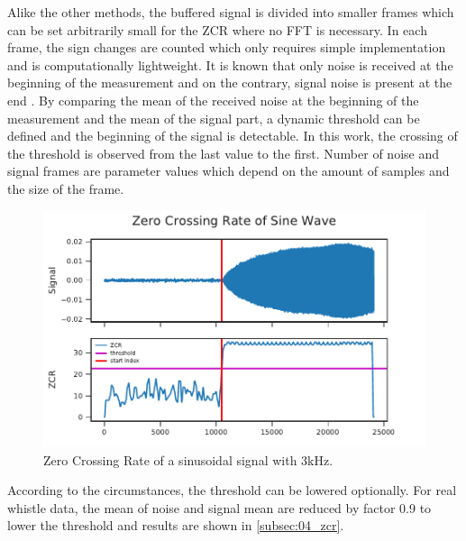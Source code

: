 Alike the other methods, the buffered signal is divided into smaller frames
which can be set arbitrarily small for the \ac{ZCR} where no \ac{FFT} is necessary.
In each frame, the sign changes are counted which only requires simple implementation
and is computationally lightweight.
It is known that only noise is received at the beginning of the measurement and on the
contrary, signal noise is present at the end .
By comparing the mean of the received noise at the beginning of the measurement and
the mean of the signal part, a dynamic threshold can be defined and the beginning of the
signal is detectable.
In this work, the crossing of the threshold is observed from the last
value to the first. 
Number of noise and signal frames are parameter values which depend
on the amount of samples and the size of the frame.
\begin{figure}[ht]
	\centering
		\includegraphics[]{figures/sine_zcr}
	\caption{Zero Crossing Rate of a sinusoidal signal with 3\si{\kilo\hertz}.}
	\label{fig:03_zcr}
\end{figure}
According to  the circumstances, the threshold can be lowered optionally.
For real whistle data, the mean of noise and signal mean are reduced by factor 0.9 to
lower the threshold and results are shown in \cref{subsec:04_zcr}.
